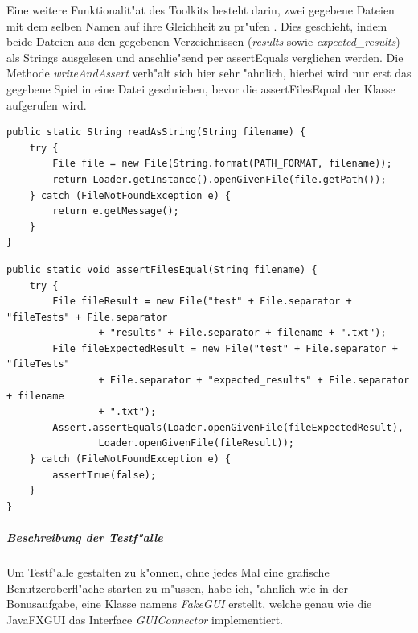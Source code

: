 Eine weitere Funktionalit"at des Toolkits besteht darin, zwei gegebene Dateien mit dem selben Namen auf ihre Gleichheit zu pr"ufen . Dies geschieht, indem beide Dateien aus den gegebenen Verzeichnissen (\emph{results} sowie \emph{expected\_results}) als Strings ausgelesen und anschlie"send per assertEquals verglichen werden. Die Methode \emph{writeAndAssert} verh"alt sich hier sehr "ahnlich, hierbei wird nur erst das gegebene Spiel in eine Datei geschrieben, bevor die assertFilesEqual der Klasse aufgerufen wird. 
\begin{lstlisting}[float,style=CodeHighlighting,caption=TestToolkit - readAsString,label=lst:testToolkit_readAsString]
public static String readAsString(String filename) {
    try {
        File file = new File(String.format(PATH_FORMAT, filename));
        return Loader.getInstance().openGivenFile(file.getPath());
    } catch (FileNotFoundException e) {
        return e.getMessage();
    }
}
\end{lstlisting}
\begin{lstlisting}[float,style=CodeHighlighting,caption=TestToolkit - assertFilesEqual,label=lst:testToolkit_assertFilesEqual]
public static void assertFilesEqual(String filename) {
    try {
        File fileResult = new File("test" + File.separator + "fileTests" + File.separator
                + "results" + File.separator + filename + ".txt");
        File fileExpectedResult = new File("test" + File.separator + "fileTests" 
        		+ File.separator + "expected_results" + File.separator + filename 
        		+ ".txt");
        Assert.assertEquals(Loader.openGivenFile(fileExpectedResult), 
        		Loader.openGivenFile(fileResult));
    } catch (FileNotFoundException e) {
        assertTrue(false);
    }
}
\end{lstlisting}

\subparagraph{Beschreibung der Testf"alle}
Um Testf"alle gestalten zu k"onnen, ohne jedes Mal eine grafische Benutzeroberfl"ache starten zu m"ussen, habe ich, "ahnlich wie in der Bonusaufgabe, eine Klasse namens \emph{FakeGUI} erstellt, welche genau wie die JavaFXGUI das Interface \emph{GUIConnector} implementiert.


